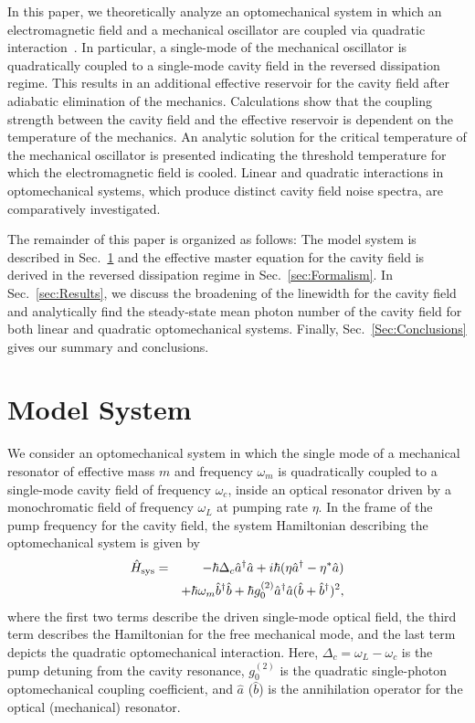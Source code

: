 \documentclass[pra,aps,showpacs,twocolumn,floatfix, superscriptaddress, nofootinbib, nobibnotes]{revtex4-1}
\begin{document}
In this paper, we theoretically analyze an optomechanical system in which an electromagnetic field and a mechanical oscillator are coupled via quadratic interaction~\cite{PhysRevA.82.021806, Sankey:2010aa, PhysRevX.5.041024}. 
In particular, a single-mode of the mechanical oscillator is quadratically coupled to a single-mode cavity field in the reversed dissipation regime. This results in an additional effective reservoir for the cavity field after adiabatic elimination of the mechanics. Calculations show that the coupling strength between the cavity field and the effective reservoir is dependent on the temperature of the mechanics. An analytic solution for the critical temperature of the mechanical oscillator is presented indicating the threshold temperature for which the electromagnetic field is cooled. Linear and quadratic interactions in optomechanical systems,  which produce distinct cavity field noise spectra, are comparatively investigated.

The remainder of this paper is organized as follows:
The model system is described in Sec.~\ref{sec:Model System} and the effective master equation for the cavity field is derived in the reversed dissipation regime in Sec.~\ref{sec:Formalism}. In Sec.~\ref{sec:Results}, we discuss the broadening of the linewidth for the cavity field and analytically find the steady-state mean photon number of the cavity field for both linear and quadratic optomechanical systems. Finally, Sec.~\ref{Sec:Conclusions} gives our summary and conclusions. 

\section{Model System}
\label{sec:Model System}
We consider an optomechanical system in which the single mode of a mechanical resonator of effective mass $m$ and frequency $\omega_m$ is quadratically coupled to a single-mode cavity field of frequency $\omega_c$, inside an optical resonator driven by a monochromatic field of frequency $\omega_{L}$ at pumping rate $\eta$. In the frame of the pump frequency for the cavity field, the system Hamiltonian describing the optomechanical system is given by 
\begin{eqnarray}
 \hat H_{\rm sys} &=& -\hbar\Delta_c \hat a^\dag \hat a + i\hbar(\eta\hat a^\dag- \eta^*\hat a) \nonumber  \\ 
 &&+ \hbar\omega_m \hat b^\dag\hat b+\hbar g_0^{(2)}\hat a^\dag \hat a (\hat b+\hat b^\dag)^2,
\end{eqnarray}
where the first two terms describe the driven single-mode optical field, the third term describes the Hamiltonian for the free mechanical mode, and the last term depicts the quadratic optomechanical interaction. Here, $\Delta_c=\omega_L-\omega_c$ is the pump detuning from the cavity resonance, $g_0^{(2)}$ is the quadratic single-photon optomechanical coupling coefficient, and $\hat a$ ($\hat b$) is the annihilation operator for the optical (mechanical) resonator.    
\end{document}
